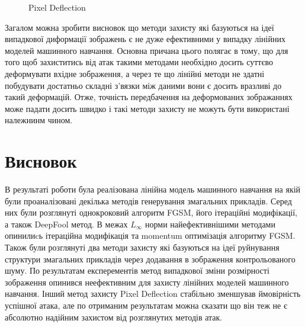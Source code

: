 \documentclass[a4paper,14pt]{extreport}
\begin{document}
\begin{figure}[!htb]
		\endminipage\hfill
		\caption{Pixel Deflection}
		\label{fig:pixeldeflection}
	\end{figure}
	
	Загалом можна зробити висновок що методи захисту які базуються на ідеї випадкової диформації зображень є не дуже ефективними у випадку лінійних моделей машинного навчання. Основна причана цього полягає в тому, що для того щоб захиститись від атак такими методами необхідно досить суттєво деформувати вхідне зображення, а через те що лінійні методи не здатні побудувати достатньо складні з'вязки між даними вони є досить вразливі до такий деформацій. Отже, точність передбачення на деформованих зображаннях може падати досить швидко і такі методи захисту не можуть бути використані належнинм чином.

	\chapter{Висновок} 
	
	В результаті роботи була реалізована лінійна модель машинного навчання на якій були проаналізовані декілька методів генерування змагальних прикладів. Серед них були розглянуті однокроковий алгоритм FGSM, його ітераційні модифікації, а також DeepFool метод. В межах $L_{\infty}$ норми найефективнішими методами опинилиcь ітераційна модифікація та momentum оптимізація алгоритму FGSM. Також були розглянуті два методи захисту які базуються на ідеї руйнування структури змагальних прикладів через додавання в зображення контрольованого шуму. По результатам експерементів метод випадкової зміни розмірності зображення опинився неефективним для захисту лінійних моделей машинного навчання. Інший метод захисту Pixel Deflection стабільно зменшував ймовірність успішної атака, але по отриманим результатам можна сказати що він теж не є абсолютно надійним захистом від розглянутих методів атак.
	

	\nocite{goodfellow2014explaining}
	\nocite{kurakin2016adversarial}
	\nocite{moosavidezfooli2015deepfool}
	\nocite{dong2017boosting}
	\nocite{dong2019benchmarking}
	\nocite{yuan2017adversarial}
	\nocite{kurakin2018adversarial}
	\nocite{naseer2018local}
	\nocite{santhanam2018defending}
	\nocite{prakash2018deflecting}
	\printbibliography[title={Бібліографія}]
\end{document}

